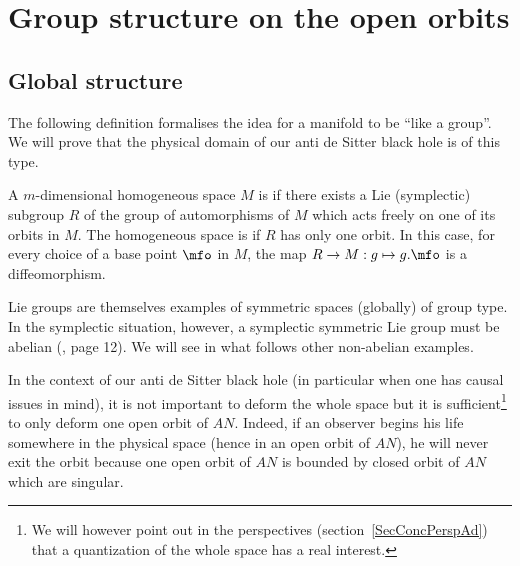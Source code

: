 \section{Group structure on the open orbits}
\label{SecGpStructOuvertOrb}

\subsection{Global structure}

The following definition formalises the idea for a manifold to be ``like a group''. We will prove that the physical domain of our anti de Sitter black hole is of this type.
\begin{definition}
	A $m$-dimensional homogeneous space $M$ is  if there exists a Lie (symplectic) subgroup $R$ of the group of automorphisms of $M$ which acts freely on one of its orbits in $M$. The homogeneous space is  if $R$ has only one orbit. In this case, for every choice of a base point $\mfo$ in $M$, the map $R\to M:g\mapsto g.\mfo$ is a diffeomorphism.
	\label{DefGlobGpType}
\end{definition}

Lie groups are themselves examples of symmetric spaces (globally) of group type.  In the symplectic situation, however, a symplectic symmetric Lie group must be abelian (\cite{ThzPierre}, page 12). We will see in what follows other non-abelian examples.

In the context of our anti de Sitter black hole (in particular when one has causal issues in mind), it is not important to deform the whole space but it is sufficient\footnote{We will however point out in the perspectives (section~\ref{SecConcPerspAd}) that a quantization of the whole space has a real interest.} to only deform one open orbit of $AN$. Indeed, if an observer begins his life somewhere in the physical space (hence in an open orbit of $AN$), he will never exit the orbit because one open orbit of $AN$ is bounded by closed orbit of $AN$ which are singular.


